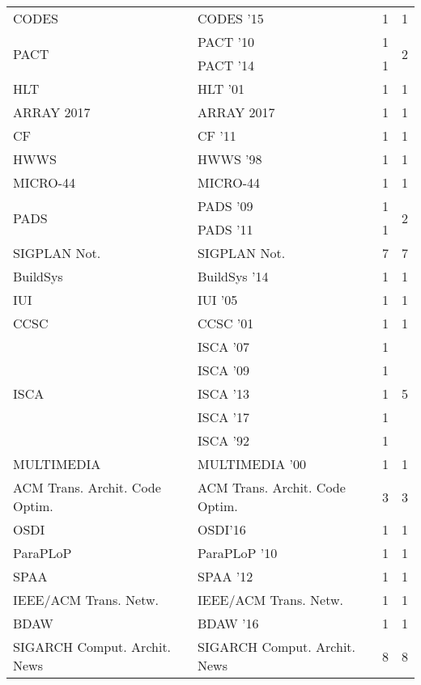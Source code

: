 \begin{table*}[t]
\begin{tabular}{llrr}
\multirow{1}{*}{CODES } & CODES '15 & 1 & \multirow{1}{*}{1}\\
\multirow{2}{*}{PACT } & PACT '10 & 1 & \multirow{2}{*}{2}\\
& PACT '14 & 1 &\\
\multirow{1}{*}{HLT } & HLT '01 & 1 & \multirow{1}{*}{1}\\
\multirow{1}{*}{ARRAY 2017} & ARRAY 2017 & 1 & \multirow{1}{*}{1}\\
\multirow{1}{*}{CF } & CF '11 & 1 & \multirow{1}{*}{1}\\
\multirow{1}{*}{HWWS } & HWWS '98 & 1 & \multirow{1}{*}{1}\\
\multirow{1}{*}{MICRO-44} & MICRO-44 & 1 & \multirow{1}{*}{1}\\
\multirow{2}{*}{PADS } & PADS '09 & 1 & \multirow{2}{*}{2}\\
& PADS '11 & 1 &\\
\multirow{1}{*}{SIGPLAN Not.} & SIGPLAN Not. & 7 & \multirow{1}{*}{7}\\
\multirow{1}{*}{BuildSys } & BuildSys '14 & 1 & \multirow{1}{*}{1}\\
\multirow{1}{*}{IUI } & IUI '05 & 1 & \multirow{1}{*}{1}\\
\multirow{1}{*}{CCSC } & CCSC '01 & 1 & \multirow{1}{*}{1}\\
\multirow{5}{*}{ISCA } & ISCA '07 & 1 & \multirow{5}{*}{5}\\
& ISCA '09 & 1 &\\
& ISCA '13 & 1 &\\
& ISCA '17 & 1 &\\
& ISCA '92 & 1 &\\
\multirow{1}{*}{MULTIMEDIA } & MULTIMEDIA '00 & 1 & \multirow{1}{*}{1}\\
\multirow{1}{*}{ACM Trans. Archit. Code Optim.} & ACM Trans. Archit. Code Optim. & 3 & \multirow{1}{*}{3}\\
\multirow{1}{*}{OSDI} & OSDI'16 & 1 & \multirow{1}{*}{1}\\
\multirow{1}{*}{ParaPLoP } & ParaPLoP '10 & 1 & \multirow{1}{*}{1}\\
\multirow{1}{*}{SPAA } & SPAA '12 & 1 & \multirow{1}{*}{1}\\
\multirow{1}{*}{IEEE/ACM Trans. Netw.} & IEEE/ACM Trans. Netw. & 1 & \multirow{1}{*}{1}\\
\multirow{1}{*}{BDAW } & BDAW '16 & 1 & \multirow{1}{*}{1}\\
\multirow{1}{*}{SIGARCH Comput. Archit. News} & SIGARCH Comput. Archit. News & 8 & \multirow{1}{*}{8}\\

\end{tabular}
\end{table*}
